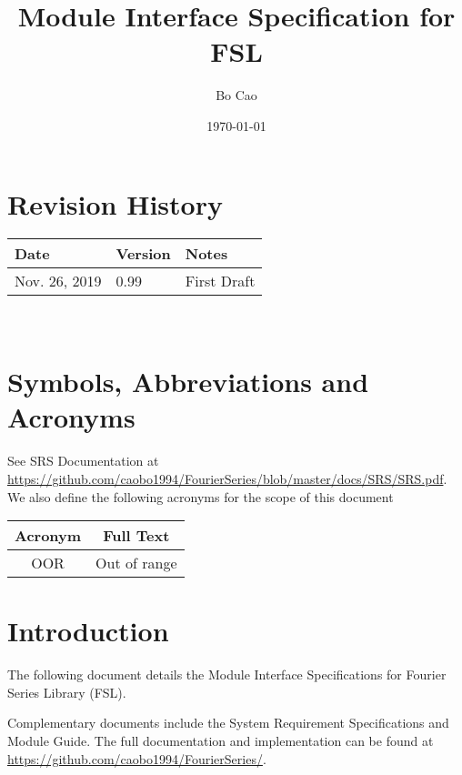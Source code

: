 \documentclass[12pt, titlepage]{article}
\begin{document}
\title{Module Interface Specification for FSL}

\author{Bo Cao}

\date{\today}

\maketitle


\section{Revision History}

\begin{tabularx}{\textwidth}{p{3cm}p{2cm}X}
\toprule {\bf Date} & {\bf Version} & {\bf Notes}\\
\midrule
Nov. 26, 2019 & 0.99 & First Draft\\
\bottomrule
\end{tabularx}

~\newpage

\section{Symbols, Abbreviations and Acronyms}

See SRS Documentation at \url{https://github.com/caobo1994/FourierSeries/blob/master/docs/SRS/SRS.pdf}.
We also define the following acronyms for the scope of this document
\begin{center}
	
\begin{tabular}{c c}
	\hline
	\textbf{Acronym} & \textbf{Full Text}\\
	\hline
	OOR & Out of range\\
	\hline
\end{tabular}
\end{center}
\newpage

\tableofcontents

\newpage


\section{Introduction}

The following document details the Module Interface Specifications for
Fourier Series Library (FSL).

Complementary documents include the System Requirement Specifications
and Module Guide.  The full documentation and implementation can be
found at \url{https://github.com/caobo1994/FourierSeries/}.
\end{document}
